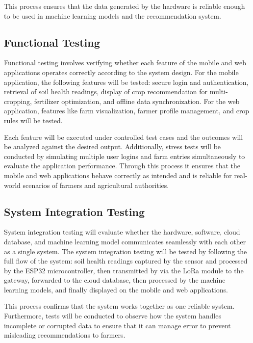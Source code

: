 {	This process ensures that the data generated by the hardware is reliable enough to be used in machine learning models and the recommendation system.
	
	\subsection{Functional Testing}
	Functional testing involves verifying whether each feature of the mobile and web applications operates correctly according to the system design. For the mobile application, the following features will be tested: secure login and authentication, retrieval of soil health readings, display of crop recommendation for multi-cropping, fertilizer optimization, and offline data synchronization. For the web application, features like farm visualization, farmer profile management, and crop rules will be tested.
	
	Each feature will be executed under controlled test cases and the outcomes will be analyzed against the desired output. Additionally, stress tests will be conducted by simulating multiple user logins and farm entries simultaneously to evaluate the application performance. Through this process it ensures that the mobile and web applications behave correctly as intended and is reliable for real-world scenarios of farmers and agricultural authorities.
	
	\subsection{System Integration Testing}
	System integration testing will evaluate whether the hardware, software, cloud database, and machine learning model communicates seamlessly with each other as a single system. The system integration testing will be tested by following the full flow of the system: soil health readings captured by the sensor and processed by the ESP32 microcontroller, then transmitted by via the LoRa module to the gateway, forwarded to the cloud database, then processed by the machine learning models, and finally displayed on the mobile and web applications. 
	
	This process confirms that the system works together as one reliable system. Furthermore, tests will be conducted to observe how the system handles incomplete or corrupted data to ensure that it can manage error to prevent misleading recommendations to farmers.
	
}
